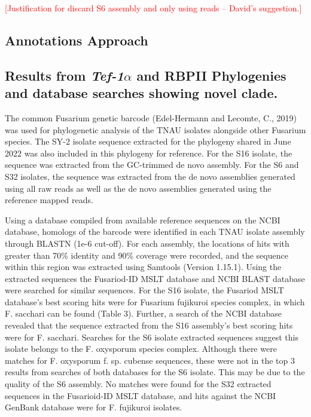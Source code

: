 \textcolor{red}{[Justification for discard S6 assembly and only using reads – David’s suggestion.]}

\subsection{Annotations Approach}

\subsection{Results from \textit{Tef-1\(\alpha\)} and RBPII Phylogenies and database searches showing novel clade.}

The common Fusarium genetic barcode  (Edel-Hermann and Lecomte, C., 2019) was used for phylogenetic analysis of the TNAU isolates alongside other Fusarium species. The SY-2 isolate \Tef sequence extracted for the phylogeny shared in June 2022 was also included in this phylogeny for reference. For the S16 isolate, the \Tef  sequence was extracted from the GC-trimmed de novo assembly. For the S6 and S32 isolates, the \Tef  sequence was extracted from the de novo assemblies generated using all raw reads as well as the de novo assemblies generated using the reference mapped reads.  

Using a \Tef database compiled from available reference sequences on the NCBI database, homologs of the \Tef barcode were identified in each TNAU isolate assembly through BLASTN (1e-6 cut-off). For each assembly, the locations of hits with greater than 70\% identity and 90\% coverage were recorded, and the sequence within this region was extracted using Samtools (Version 1.15.1). Using the extracted \Tef sequences the Fusariod-ID MSLT database and NCBI BLAST database were searched for similar sequences. For the S16 isolate, the Fusariod MSLT database's best scoring hits were for Fusarium fujikuroi species complex, in which F. sacchari can be found (Table 3). Further, a search of the NCBI database revealed that the \Tef sequence extracted from the S16 assembly's best scoring hits were for F. sacchari. Searches for the S6 isolate extracted \Tef sequences suggest this isolate belongs to the F. oxysporum species complex. Although there were matches for F. oxysporum f. sp. cubense  \Tef sequences, these were not in the top 3 results from searches of both databases for the S6 isolate. This may be due to the quality of the S6 assembly. No matches were found for the S32 extracted \Tef sequences in the Fusarioid-ID MSLT database, and hits against the NCBI GenBank database were for F. fujikuroi isolates.  

